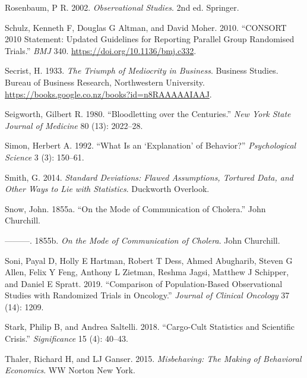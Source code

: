 \documentclass[
  10ptls,
  b5paper]{book}
\newlength{\cslhangindent}
\newlength{\cslentryspacingunit} %
\newenvironment{CSLReferences}[2] %
 {%
  \setlength{\parindent}{0pt}
  \ifodd #1
  \let\oldpar\par
  \def\par{\hangindent=\cslhangindent\oldpar}
  \fi
  \setlength{\parskip}{#2\cslentryspacingunit}
 }%
 {}
\begin{document}
\begin{CSLReferences}{1}{0}
\leavevmode{}%
Rosenbaum, P R. 2002. \emph{Observational Studies}. 2nd ed. Springer.

\leavevmode{}%
Schulz, Kenneth F, Douglas G Altman, and David Moher. 2010. {``CONSORT 2010 Statement: Updated Guidelines for Reporting Parallel Group Randomised Trials.''} \emph{BMJ} 340. \url{https://doi.org/10.1136/bmj.c332}.

\leavevmode{}%
Secrist, H. 1933. \emph{The Triumph of Mediocrity in Business}. Business Studies. Bureau of Business Research, Northwestern University. \url{https://books.google.co.nz/books?id=n8RAAAAAIAAJ}.

\leavevmode{}%
Seigworth, Gilbert R. 1980. {``Bloodletting over the Centuries.''} \emph{New York State Journal of Medicine} 80 (13): 2022--28.

\leavevmode{}%
Simon, Herbert A. 1992. {``What Is an {`Explanation'} of Behavior?''} \emph{Psychological Science} 3 (3): 150--61.

\leavevmode{}%
Smith, G. 2014. \emph{Standard Deviations: Flawed Assumptions, Tortured Data, and Other Ways to Lie with Statistics}. Duckworth Overlook.

\leavevmode{}%
Snow, John. 1855a. {``On the Mode of Communication of Cholera.''} John Churchill.

\leavevmode{}%
---------. 1855b. \emph{On the Mode of Communication of Cholera}. John Churchill.

\leavevmode{}%
Soni, Payal D, Holly E Hartman, Robert T Dess, Ahmed Abugharib, Steven G Allen, Felix Y Feng, Anthony L Zietman, Reshma Jagsi, Matthew J Schipper, and Daniel E Spratt. 2019. {``Comparison of Population-Based Observational Studies with Randomized Trials in Oncology.''} \emph{Journal of Clinical Oncology} 37 (14): 1209.

\leavevmode{}%
Stark, Philip B, and Andrea Saltelli. 2018. {``Cargo-Cult Statistics and Scientific Crisis.''} \emph{Significance} 15 (4): 40--43.

\leavevmode{}%
Thaler, Richard H, and LJ Ganser. 2015. \emph{Misbehaving: The Making of Behavioral Economics}. WW Norton New York.


\end{CSLReferences}
\end{document}
